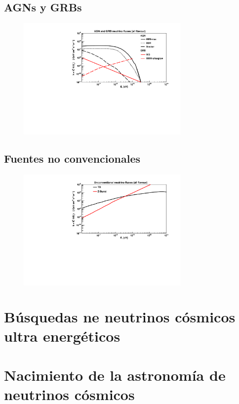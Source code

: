 	\subsection{AGNs y GRBs}
	
	\begin{figure}[ht]
		\begin{center}
		\includegraphics[width=0.75\textwidth]{fig/introduccion/AGN_GRB_nufluxes}
		\caption{\label{fig:flujosAGN} }
		\end{center}
	\end{figure}
	
	\subsection{Fuentes no convencionales}
	
	\begin{figure}[ht]
		\begin{center}
		\includegraphics[width=0.75\textwidth]{fig/introduccion/unconventional_nuFluxes}
		\caption{\label{fig:flujosNoConv} }
		\end{center}
	\end{figure}

\section{Búsquedas ne neutrinos cósmicos ultra energéticos}

\section{Nacimiento de la astronom\'ia de neutrinos c\'osmicos}

